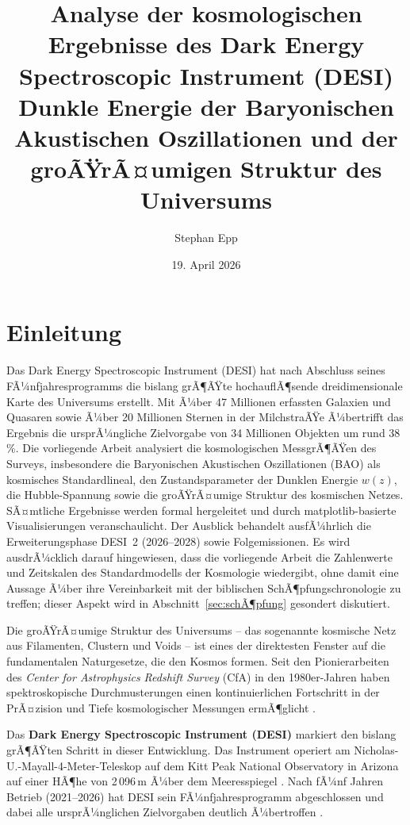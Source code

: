 ﻿\documentclass[a4paper,12pt]{article}
\title{\textbf{Analyse der kosmologischen Ergebnisse des Dark Energy Spectroscopic Instrument (DESI)}\\
  {\Large Dunkle Energie der Baryonischen Akustischen Oszillationen und der groÃŸrÃ¤umigen Struktur des Universums}}
\date{19. April 2026}
\author{Stephan Epp}
\theoremstyle{definition}
\theoremstyle{remark}
\begin{document}

\maketitle

\tableofcontents
\newpage

\section{Einleitung}
\label{sec:einleitung}
Das Dark Energy Spectroscopic Instrument (DESI) hat nach Abschluss seines
FÃ¼nfjahresprogramms die bislang grÃ¶ÃŸte hochauflÃ¶sende dreidimensionale Karte
des Universums erstellt. Mit Ã¼ber 47 Millionen erfassten Galaxien und Quasaren
sowie Ã¼ber 20 Millionen Sternen in der MilchstraÃŸe Ã¼bertrifft das Ergebnis die
ursprÃ¼ngliche Zielvorgabe von 34 Millionen Objekten um rund 38\,\%. Die
vorliegende Arbeit analysiert die kosmologischen MessgrÃ¶ÃŸen des Surveys,
insbesondere die Baryonischen Akustischen Oszillationen (BAO) als kosmisches
Standardlineal, den Zustandsparameter der Dunklen Energie $w(z)$, die
Hubble-Spannung sowie die groÃŸrÃ¤umige Struktur des kosmischen Netzes.
SÃ¤mtliche Ergebnisse werden formal hergeleitet und durch matplotlib-basierte
Visualisierungen veranschaulicht. Der Ausblick behandelt ausfÃ¼hrlich die
Erweiterungsphase DESI~2 (2026--2028) sowie Folgemissionen. Es wird
ausdrÃ¼cklich darauf hingewiesen, dass die vorliegende Arbeit die
Zahlenwerte und Zeitskalen des Standardmodells der Kosmologie wiedergibt,
ohne damit eine Aussage Ã¼ber ihre Vereinbarkeit mit der biblischen
SchÃ¶pfungschronologie zu treffen; dieser Aspekt wird in Abschnitt~\ref{sec:schÃ¶pfung}
gesondert diskutiert.

Die groÃŸrÃ¤umige Struktur des Universums -- das sogenannte kosmische Netz aus
Filamenten, Clustern und Voids -- ist eines der direktesten Fenster auf die
fundamentalen Naturgesetze, die den Kosmos formen. Seit den Pionierarbeiten
des \textit{Center for Astrophysics Redshift Survey} (CfA) in den 1980er-Jahren
haben spektroskopische Durchmusterungen einen kontinuierlichen Fortschritt in
der PrÃ¤zision und Tiefe kosmologischer Messungen ermÃ¶glicht \cite{geller1989}.

Das \textbf{Dark Energy Spectroscopic Instrument (DESI)} markiert den bislang
grÃ¶ÃŸten Schritt in dieser Entwicklung. Das Instrument operiert am
Nicholas-U.-Mayall-4-Meter-Teleskop auf dem Kitt Peak National Observatory
in Arizona auf einer HÃ¶he von 2\,096\,m Ã¼ber dem Meeresspiegel \cite{desi2016}.
Nach fÃ¼nf Jahren Betrieb (2021--2026) hat DESI sein FÃ¼nfjahresprogramm
abgeschlossen und dabei alle ursprÃ¼nglichen Zielvorgaben deutlich Ã¼bertroffen
\cite{desi2024dr1}.
\end{document}
